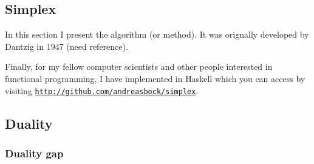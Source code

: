\subsection{Simplex}

In this section I present the \simplex algorithm (or method). It was orignally developed by
Dantzig in 1947 (need reference).

Finally, for my fellow computer scientists and other people interested in
functional programming, I have implemented \simplex in Haskell which you
can access by visiting \href{http://github.com/andreasbock/simplex}{\tt http://github.com/andreasbock/simplex}.

\subsection{Duality}\label{sec:duality}

\subsubsection{Duality gap}
